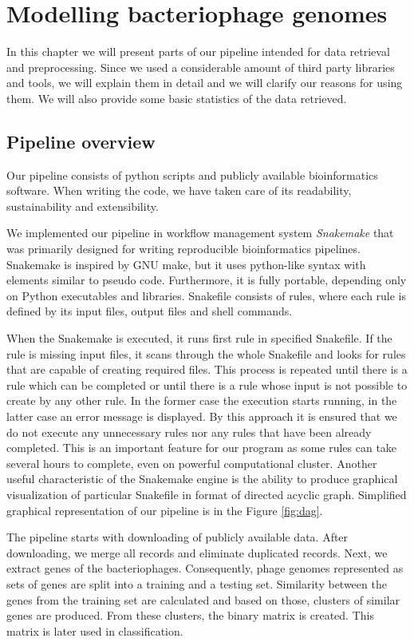 \chapter{Modelling bacteriophage genomes}
In this chapter we will present parts of our pipeline intended for data retrieval and preprocessing.
Since we used a considerable amount of third party libraries and tools, we will explain them in detail and we will clarify our reasons for using them.
We will also provide some basic statistics of the data retrieved.

\section{Pipeline overview}
Our pipeline consists of python scripts and publicly available bioinformatics software.
When writing the code, we have taken care of its readability, sustainability and extensibility.

We implemented our pipeline in  workflow management system \emph{Snakemake} \cite{} that was primarily designed for writing reproducible bioinformatics pipelines.
Snakemake is inspired by GNU make, but it uses python-like syntax with elements similar to pseudo code.
Furthermore, it is fully portable, depending only on Python executables and libraries.
Snakefile consists of rules, where each rule is defined by its input files, output files and shell commands.

When the Snakemake is executed, it runs first rule in specified Snakefile.
If the rule is missing input files, it scans through the whole Snakefile and looks for rules that are capable of creating required files.
This process is repeated until there is a rule which can be completed or until there is a rule whose input is not possible to create by any other rule.
In the former case the execution starts running, in the latter case an error message is displayed.
By this approach it is ensured that we do not execute any unnecessary rules nor any rules that have been already completed.
This is an important feature for our program as some rules can take several hours to complete, even on powerful computational cluster.
Another useful characteristic of the Snakemake engine is the ability to produce graphical visualization of particular Snakefile in format of directed acyclic graph.
Simplified graphical representation of our pipeline is in the Figure \ref{fig:dag}.

The pipeline starts with downloading of publicly available data.
After downloading, we merge all records and eliminate duplicated records.
Next, we extract genes of the bacteriophages.
Consequently, phage genomes represented as sets of genes are split into a training and a testing set.
Similarity between the genes from the training set are calculated and based on those, clusters of similar genes are produced.
From these clusters, the binary matrix is created.
This matrix is later used in classification.

